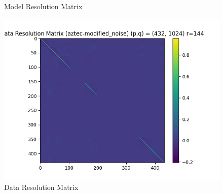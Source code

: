 \documentclass{article}
\begin{document}
\begin{itemize}
\begin{figure}[h]
        \caption{Model Resolution Matrix}
    \end{figure}
    \begin{figure}[h]
        \centering
        \includegraphics[width=1\textwidth]{images/outputs/datares/aztec-modified_noise.png}
        \caption{Data Resolution Matrix}
    \end{figure}
    \clearpage



\end{itemize}
\end{document}
